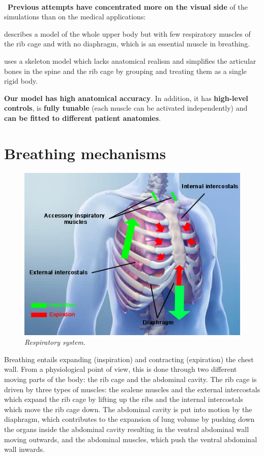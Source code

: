 \documentclass[boxedsections ,landscape, a0]{sciposter_v2}
\begin{document}
\begin{multicols}{4}
\
\\
\
\textbf{Previous attempts have concentrated more on the visual
side} of the simulations than on the medical applications:


\cite{lee2009comprehensive} describes
a model of the whole upper body but with few respiratory muscles
of the rib cage and with no diaphragm, which is an essential muscle
in breathing. 


\cite{zordan2004breathe} uses a skeleton model which lacks anatomical 
realism and simplifies the articular bones
in the spine and the rib cage by grouping and treating them as a
single rigid body. 

\textbf{Our model has high anatomical accuracy}. In addition, it has \textbf{high-level controls}, is \textbf{fully
tunable} (each muscle can be activated independently) and \textbf{can be
fitted to different patient anatomies}.



\section{Breathing mechanisms}


\begin{figure}
\vspace{-\bigskipamount}     
  \begin{center}
    \includegraphics[width=0.5\columnwidth]{imgs/respiratory_schema}
      \emph{Respiratory system.}
  \end{center}
     
\end{figure}

Breathing entails expanding (inspiration) and contracting (expiration)
the chest wall. From a physiological point of view, this is done
through two different moving parts of the body: the rib cage and the
abdominal cavity. The rib cage is driven by three types of muscles: the scalene muscles and the external intercostals which expand the
rib cage by lifting up the ribs and the internal intercostals which
move the rib cage down. The abdominal cavity is put into motion
by the diaphragm, which contributes to the expansion of lung volume
by pushing down the organs inside the abdominal cavity resulting
in the ventral abdominal wall moving outwards, and the abdominal
muscles, which push the ventral abdominal wall inwards.



\end{multicols}
\end{document}

